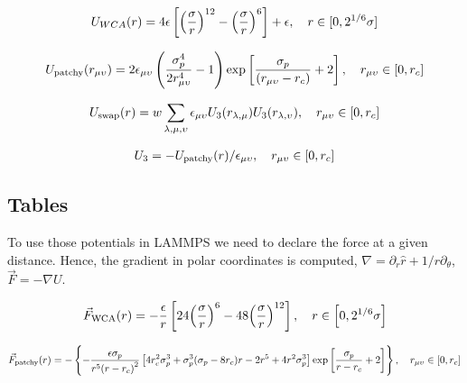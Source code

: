 \documentclass[../main.tex]{subfiles}
\begin{document}
\begin{gather}
    U_{WCA}(r) = 4\epsilon\left[\qty(\frac{\sigma}{r})^{12}-\qty(\frac{\sigma}{r})^6\right]+\epsilon,\quad r\in[0,2^{1/6}\sigma]\label{eqn:CL-MO_interaction}
\end{gather}

\begin{gather}
    U_{\mathrm{patchy}}\qty(r_{\mu\upsilon}) = 2\epsilon_{\mu\upsilon}\left(\frac{\sigma_p^4}{2 r_{\mu\upsilon}^4}-1\right)\exp\left[\frac{\sigma_p}{\qty(r_{\mu\upsilon}-r_{c})}+2\right],\quad r_{\mu\upsilon}\in\qty[0,r_c] \label{eqn:patch-patch_interaction}
\end{gather}

\begin{gather}
	U_{\mathrm{swap}}(r) = w\sum_{\lambda,\mu,\upsilon}\epsilon_{\mu\upsilon}U_3\qty(r_{\lambda,\mu})U_3\qty(r_{\lambda,\upsilon}),\quad r_{\mu\upsilon}\in\qty[0,r_c]\label{eqn:swap_interaction}
\end{gather}

\begin{gather}
	U_{3} = -U_{\mathrm{patchy}}\qty(r)/\epsilon_{\mu\upsilon}\label{eqn:swapmod_interaction},\quad r_{\mu\upsilon}\in\qty[0,r_c]
\end{gather}

\subsection{Tables}

To use those potentials in LAMMPS we need to declare the force at a given distance.
Hence, the gradient in polar coordinates is computed, $\nabla = \partial_{r}\hat{r} + 1/r\partial_\theta$, $\vec{F}=-\nabla U$.

\begin{gather}
    \vec{F}_{\mathrm{WCA}}(r) = -\frac{\epsilon}{r}\left[24\qty(\frac{\sigma}{r})^6-48\qty(\frac{\sigma}{r})^{12}\right],\quad r\in\qty[0,2^{1/6}\sigma] %
\end{gather}


\begin{gather}
    \vec{F}_{\mathrm{patchy}}(r) =-\left\{ -\frac{\epsilon\sigma_p}{r^5\qty(r-r_c)^2} \left[ 4r_c^2\sigma^3_p + \sigma^3_p\qty(\sigma_p-8r_c) r -2r^5 + 4r^2 \sigma^3_p \right] \exp\left[\frac{\sigma_p}{r-r_c}+2\right]\right\},\quad r_{\mu\upsilon}\in\qty[0,r_c]
\end{gather}
\end{document}
